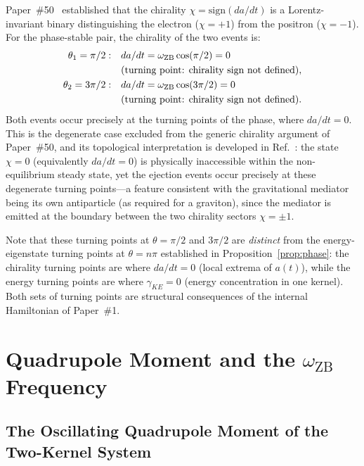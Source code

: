 \documentclass[%
 reprint, amsmath,amssymb, aps, prb, ]{revtex4-2}
\numberwithin{equation}{section}
\newcommand{\iphase}{\theta}
\newcommand{\omZB}{\omega_{\text{ZB}}}
\begin{document}
Paper~\#50~\cite{hanamura50} established that the chirality $\chi = \mathrm{sign}(da/dt)$ is a Lorentz-invariant binary distinguishing the electron ($\chi = +1$) from the positron ($\chi = -1$).
For the phase-stable pair, the chirality of the two events is:
\begin{align}
\iphase_1 = \pi/2: &\quad da/dt = \omZB\cos(\pi/2) = 0
\notag\\
&\quad\text{(turning point: chirality sign not defined)}, \\
\iphase_2 = 3\pi/2: &\quad da/dt = \omZB\cos(3\pi/2) = 0
\notag\\
&\quad\text{(turning point: chirality sign not defined).}
\end{align}
Both events occur precisely at the turning points of the phase, where $da/dt = 0$.
This is the degenerate case excluded from the generic chirality argument of Paper~\#50, and its topological interpretation is developed in Ref.~\cite{hanamura56}: the state $\chi = 0$ (equivalently $da/dt = 0$) is physically inaccessible within the non-equilibrium steady state, yet the ejection events occur precisely at these degenerate turning points---a feature consistent with the gravitational mediator being its own antiparticle (as required for a graviton), since the mediator is emitted at the boundary between the two chirality sectors $\chi = \pm 1$.

Note that these turning points at $\iphase = \pi/2$ and $3\pi/2$ are \emph{distinct} from the energy-eigenstate turning points at $\iphase = n\pi$ established in Proposition~\ref{prop:phase}: the chirality turning points are where $da/dt = 0$ (local extrema of $a(t)$), while the energy turning points are where $\gamma_{KE} = 0$ (energy concentration in one kernel).
Both sets of turning points are structural consequences of the internal Hamiltonian of Paper~\#1.

\section{\texorpdfstring{Quadrupole Moment and the $\omZB$ Frequency}{Quadrupole Moment and the omega_ZB Frequency}}
\label{sec:quadrupole}

\subsection{The Oscillating Quadrupole Moment of the Two-Kernel System}
\end{document}
